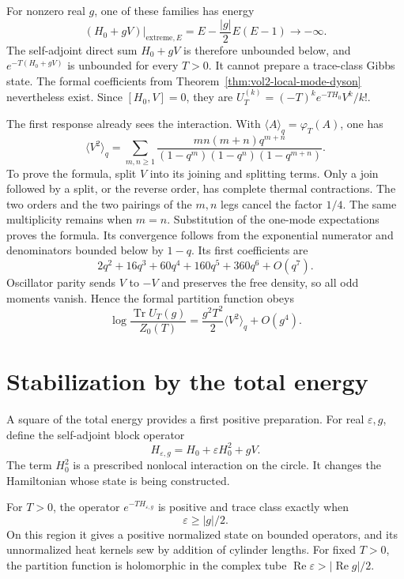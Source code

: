 For nonzero real \(g\), one of these families has energy
\[
 (H_0+gV)\big|_{\mathrm{extreme},E}
 =E-\frac{|g|}{2}E(E-1)\longrightarrow-\infty.
\]
The self-adjoint direct sum \(H_0+gV\) is therefore unbounded
below, and \(e^{-T(H_0+gV)}\) is unbounded for every \(T>0\).
It cannot prepare a trace-class Gibbs state. The formal coefficients
from Theorem~\ref{thm:vol2-local-mode-dyson} nevertheless exist.
Since \([H_0,V]=0\), they are
\(U_T^{(k)}=(-T)^k e^{-TH_0}V^k/k!\).

The first response already sees the interaction. With
\(\langle A\rangle_q=\varphi_T(A)\), one has
\begin{equation}\label{eq:vol2-cubic-thermal-moment}
 \langle V^2\rangle_q
 =\sum_{m,n\geq1}
 \frac{mn(m+n)q^{m+n}}
      {(1-q^m)(1-q^n)(1-q^{m+n})}.
\end{equation}
To prove the formula, split \(V\) into its joining and splitting
terms. Only a join followed by a split, or the reverse order,
has complete thermal contractions. The two orders and the two
pairings of the \(m,n\) legs cancel the factor \(1/4\).
The same multiplicity remains when \(m=n\). Substitution of the
one-mode expectations proves the formula. Its convergence follows
from the exponential numerator and denominators bounded below by
\(1-q\). Its first coefficients are
\[
 2q^2+16q^3+60q^4+160q^5+360q^6+O(q^7).
\]
Oscillator parity sends \(V\) to \(-V\) and preserves the free
density, so all odd moments vanish. Hence the formal partition
function obeys
\[
 \log\frac{\operatorname{Tr}U_T(g)}{Z_0(T)}
 =\frac{g^2T^2}{2}\langle V^2\rangle_q+O(g^4).
\]

\section{Stabilization by the total energy}

A square of the total energy provides a first positive preparation.
For real \(\varepsilon,g\), define the self-adjoint block operator
\[
 H_{\varepsilon,g}=H_0+\varepsilon H_0^2+gV.
\]
The term \(H_0^2\) is a prescribed nonlocal interaction on the
circle. It changes the Hamiltonian whose state is being constructed.

\begin{theorem}\label{thm:vol2-nonlocal-stability}
For \(T>0\), the operator \(e^{-TH_{\varepsilon,g}}\) is positive
and trace class exactly when
\begin{equation}\label{eq:vol2-nonlocal-threshold}
 \varepsilon\geq |g|/2.
\end{equation}
On this region it gives a positive normalized state on bounded
operators, and its unnormalized heat kernels sew by addition of
cylinder lengths. For fixed \(T>0\), the partition function is
holomorphic in the complex tube
\(\operatorname{Re}\varepsilon>|\operatorname{Re}g|/2\).
\end{theorem}

